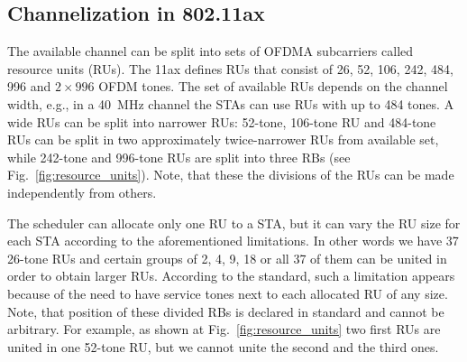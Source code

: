 \subsection{Channelization in 802.11ax}
The available channel can be split into sets of OFDMA subcarriers called resource units (RUs).
The 11ax defines RUs that consist of 26, 52, 106, 242, 484, 996 and $2\times996$ OFDM tones.
The set of available RUs depends on the channel width, e.g., in a \SI{40}{\MHz} channel the STAs can use RUs with up to 484 tones.
A wide RUs can be split into narrower RUs: 52-tone, 106-tone RU and 484-tone RUs can be split in two approximately twice-narrower RUs from available set, while 242-tone and 996-tone RUs are split into three RBs (see Fig.~\ref{fig:resource_units}).
Note, that these the divisions of the RUs can be made independently from others. 

The scheduler can allocate only one RU to a STA, but it can vary the RU size for each STA according to the aforementioned limitations.
In other words we have 37 26-tone RUs and certain groups of 2, 4, 9, 18 or all 37 of them can be united in order to obtain larger RUs.
According to the standard, such a limitation appears because of the need to have service tones next to each allocated RU of any size. 
Note, that position of these divided RBs is declared in standard and cannot be arbitrary.
For example, as shown at Fig.~\ref{fig:resource_units} two first RUs are united in one 52-tone RU, but we cannot unite the second and the third ones.


